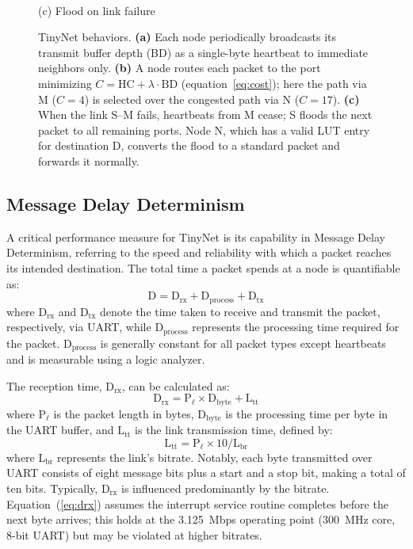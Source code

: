 \begin{figure}[t]
\begin{minipage}[t]{0.32\linewidth}
\smallskip\\
{\small (c) Flood on link failure}
\end{minipage}
\caption{TinyNet behaviors. \textbf{(a)} Each node periodically broadcasts its transmit buffer depth (BD) as a single-byte heartbeat to immediate neighbors only. \textbf{(b)} A node routes each packet to the port minimizing $C=\mathrm{HC}+\lambda\cdot\mathrm{BD}$ (equation~\ref{eq:cost}); here the path via M ($C=4$) is selected over the congested path via N ($C=17$). \textbf{(c)} When the link S--M fails, heartbeats from M cease; S floods the next packet to all remaining ports. Node N, which has a valid LUT entry for destination D, converts the flood to a standard packet and forwards it normally.}
\label{fig:tinynets-behaviors}
\end{figure}

\subsection{Message Delay Determinism}
A critical performance measure for TinyNet is its capability in Message Delay Determinism, referring to the speed and reliability with which a packet reaches its intended destination. The total time a packet spends at a node is quantifiable as:
\begin{equation}
	\mathrm{D}=\mathrm{D}_{\mathrm{rx}}+\mathrm{D}_{\mathrm{process}}+\mathrm{D}_{\mathrm{tx}}
	\label{eq:d}
\end{equation}
where $\mathrm{D}_{\mathrm{rx}}$ and $\mathrm{D}_{\mathrm{tx}}$ denote the time taken to receive and transmit the packet, respectively, via UART, while $\mathrm{D}_{\mathrm{process}}$ represents the processing time required for the packet. $\mathrm{D}_{\mathrm{process}}$ is generally constant for all packet types except heartbeats and is measurable using a logic analyzer.

The reception time, $\mathrm{D}_{\mathrm{rx}}$, can be calculated as:
\begin{equation}
	\mathrm{D}_{\mathrm{rx}}=\mathrm{P}_\ell\times \mathrm{D}_{\mathrm{byte}}+\mathrm{L}_\mathrm{tt}
	\label{eq:drx}
\end{equation}
where $\mathrm{P}_\ell$ is the packet length in bytes, $\mathrm{D}_{\mathrm{byte}}$ is the processing time per byte in the UART buffer, and $\mathrm{L}_\mathrm{tt}$ is the link transmission time, defined by:
\begin{equation}
	\mathrm{L}_\mathrm{tt}=\mathrm{P}_\ell\times 10/\mathrm{L}_\mathrm{br}
	\label{eq:ltt}
\end{equation}
where $\mathrm{L}_\mathrm{br}$ represents the link's bitrate. Notably, each byte transmitted over UART consists of eight message bits plus a start and a stop bit, making a total of ten bits. Typically, $\mathrm{D}_{\mathrm{rx}}$ is influenced predominantly by the bitrate. Equation~(\ref{eq:drx}) assumes the interrupt service routine completes before the next byte arrives; this holds at the 3.125~Mbps operating point (300~MHz core, 8-bit UART) but may be violated at higher bitrates.

